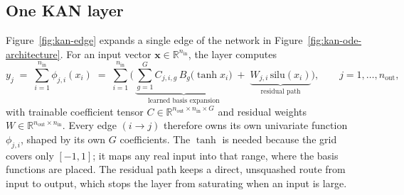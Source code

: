 \subsection{One KAN layer}

Figure~\ref{fig:kan-edge} expands a single edge of the network in
Figure~\ref{fig:kan-ode-architecture}. For an input vector
$\mathbf x\in\mathbb R^{n_{\text{in}}}$, the layer computes
\begin{equation}
y_j \;=\; \sum_{i=1}^{n_{\text{in}}}\phi_{j,i}(x_i)
\;=\; \sum_{i=1}^{n_{\text{in}}}\Big(\,\underbrace{\sum_{g=1}^{G} C_{j,i,g}\,B_g\big(\tanh x_i\big)}_{\text{learned basis expansion}}
\;+\;\underbrace{W_{j,i}\,\mathrm{silu}(x_i)}_{\text{residual path}}\Big),
\qquad j=1,\dots,n_{\text{out}},
\label{eq:kdense}
\end{equation}
with trainable coefficient tensor $C\in\mathbb R^{n_{\text{out}}\times n_{\text{in}}\times G}$
and residual weights $W\in\mathbb R^{n_{\text{out}}\times n_{\text{in}}}$.
Every edge $(i\to j)$ therefore owns its own univariate function
$\phi_{j,i}$, shaped by its own $G$ coefficients. The $\tanh$ is needed
because the grid covers only $[-1,1]$; it maps any real input into that
range, where the basis functions are placed. The residual path keeps a direct,
unsquashed route from input to output, which stops the layer from saturating
when an input is large.

